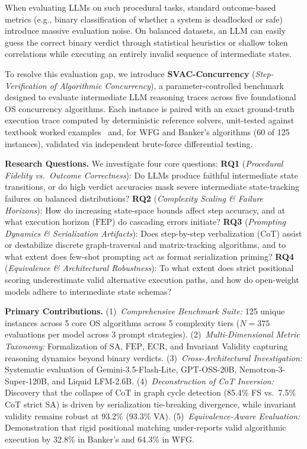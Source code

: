 \documentclass[conference]{IEEEtran}
\newcommand{\SA}{\text{SA}}
\newcommand{\FEP}{\text{FEP}}
\newcommand{\ECR}{\text{ECR}}
\begin{document}
When evaluating LLMs on such procedural tasks, standard outcome-based metrics (e.g.,
binary classification of whether a system is deadlocked or safe) introduce massive
evaluation noise. On balanced datasets, an LLM can easily guess the correct binary
verdict through statistical heuristics or shallow token correlations while executing an
entirely invalid sequence of intermediate states.

To resolve this evaluation gap, we introduce \textbf{SVAC-Concurrency}
(\emph{Step-Verification of Algorithmic Concurrency}), a parameter-controlled benchmark
designed to evaluate intermediate LLM reasoning traces across five foundational OS
concurrency algorithms. Each instance is paired with an exact ground-truth execution
trace computed by deterministic reference solvers, unit-tested against textbook worked
examples~\cite{silberschatz2018os} and, for WFG and Banker's algorithms (60 of 125 instances),
validated via independent brute-force differential testing.

\noindent\textbf{Research Questions.} We investigate four core questions:
\textbf{RQ1} (\emph{Procedural Fidelity vs.\ Outcome Correctness}): Do LLMs produce faithful intermediate state transitions, or do high verdict accuracies mask severe intermediate state-tracking failures on balanced distributions?
\textbf{RQ2} (\emph{Complexity Scaling \& Failure Horizons}): How do increasing state-space bounds affect step accuracy, and at what execution horizon ($\FEP$) do cascading errors initiate?
\textbf{RQ3} (\emph{Prompting Dynamics \& Serialization Artifacts}): Does step-by-step verbalization (CoT) assist or destabilize discrete graph-traversal and matrix-tracking algorithms, and to what extent does few-shot prompting act as format serialization priming?
\textbf{RQ4} (\emph{Equivalence \& Architectural Robustness}): To what extent does strict positional scoring underestimate valid alternative execution paths, and how do open-weight models adhere to intermediate state schemas?

\smallskip
\noindent\textbf{Primary Contributions.}
(1)~\emph{Comprehensive Benchmark Suite:} 125 unique instances across 5 core OS algorithms across 5 complexity tiers ($N{=}375$ evaluations per model across 3 prompt strategies).
(2)~\emph{Multi-Dimensional Metric Taxonomy:} Formalization of $\SA$, $\FEP$, $\ECR$, and Invariant Validity capturing reasoning dynamics beyond binary verdicts.
(3)~\emph{Cross-Architectural Investigation:} Systematic evaluation of Gemini-3.5-Flash-Lite, GPT-OSS-20B, Nemotron-3-Super-120B, and Liquid LFM-2.6B.
(4)~\emph{Deconstruction of CoT Inversion:} Discovery that the collapse of CoT in graph cycle detection (85.4\% FS vs.\ 7.5\% CoT strict SA) is driven by serialization tie-breaking divergence, while invariant validity remains robust at 93.2\% (93.3\% VA).
(5)~\emph{Equivalence-Aware Evaluation:} Demonstration that rigid positional matching under-reports valid algorithmic execution by 32.8\% in Banker's and 64.3\% in WFG.
\end{document}
